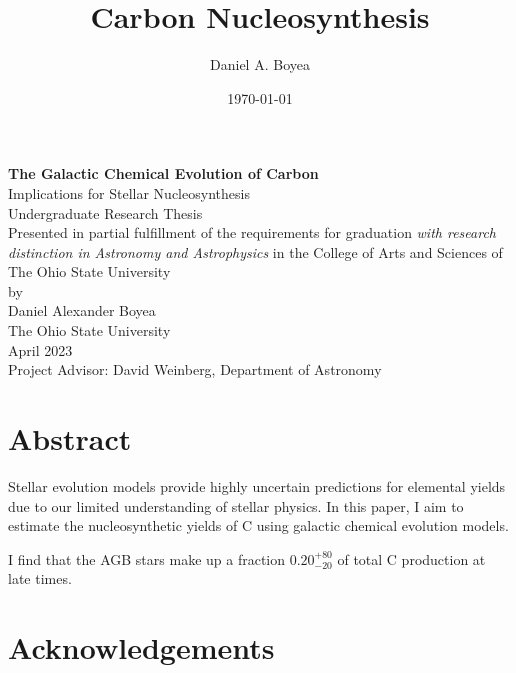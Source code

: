 \documentclass[12pt,oneside]{report}
\title{Carbon Nucleosynthesis}
\author{Daniel A. Boyea}
\date{\today}
\begin{document}


\begin{titlepage}
   \begin{center}
       \vspace*{5\baselineskip}
       \textbf{The Galactic Chemical Evolution of Carbon} \\
       Implications for Stellar Nucleosynthesis\\
       \vspace*{3\baselineskip}
        Undergraduate Research Thesis\\
       \vspace*{3\baselineskip}
    Presented in partial fulfillment of the requirements for graduation \textit{with research distinction in Astronomy and Astrophysics} in the College of Arts and Sciences of The Ohio State University \\
       \vspace*{3\baselineskip}
        by \\
       \vspace*{3\baselineskip}
       {Daniel Alexander Boyea}\\
       \vspace*{3\baselineskip}
       The Ohio State University\\
       April 2023\\
       \vspace*{3\baselineskip}
       Project Advisor: David Weinberg, Department of Astronomy
       \vfill
   \end{center}
\end{titlepage}



\chapter*{Abstract}
Stellar evolution models provide highly uncertain predictions for elemental yields due to our limited understanding of stellar physics. In this paper, I aim to estimate the nucleosynthetic yields of C using galactic chemical evolution models. 

I find that the AGB stars make up a fraction $0.20_{-20}^{+80}$ of total C production at late times. 

\chapter*{Acknowledgements}
\end{document}
